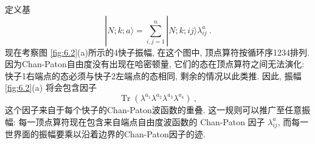 定义基
\begin{equation}
	|N ; k ; a\rangle=\sum_{i, j=1}^{n}|N ; k ; i j\rangle \lambda_{i j}^{a}  \:. \label{6.5.3}
\end{equation}
现在考察图 \ref{fig:6.2}(a)所示的4快子振幅, 在这个图中, 顶点算符按循环序1234排列. 因为Chan-Paton自由度没有出现在哈密顿量, 
它们的态在顶点算符之间无法演化: 快子1右端点的态必须与快子2左端点的态相同, 剩余的情况以此类推. 因此, 振幅 \ref{fig:6.2}(a) 将会包含因子
\begin{equation}
	\operatorname{Tr}(\lambda^{a_{1}} \lambda^{a_{2}} \lambda^{a_{3}} \lambda^{a_{4}}) \:, \label{6.5.4}
\end{equation}
这个因子来自于每个快子的Chan-Paton波函数的重叠. 这一规则可以推广至任意振幅: 每一顶点算符现在包含来自端点自由度波函数的 Chan-Paton 因子 $\lambda_{i j}^{a}$, 
而每一世界面的振幅要乘以沿着边界的Chan-Paton因子的迹.

